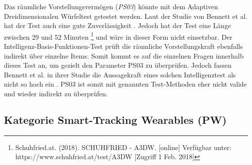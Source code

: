 Das räumliche Vorstellungsvermögen (\textit{PS03}) könnte mit dem Adaptiven Dreidimensionalen Würfeltest getestet werden. Laut der Studie von Bennett et al. hat der Test auch eine gute Zuverlässigkeit \cite{cognitivetestsfitnesstodrive}. Jedoch hat der Test eine Länge zwischen 29 und 52 Minuten \footnote{Schuhfried.at. (2018). SCHUHFRIED - A3DW. [online] Verfügbar unter: https://www.schuhfried.at/test/A3DW [Zugriff 1 Feb. 2018]} und wäre in dieser Form nicht einsetzbar. Der Intelligenz-Basis-Funktionen-Test prüft die räumliche Vorstellungskraft ebenfalls indirekt über einzelne Items. Somit kommt es auf die einzelnen Fragen innerhalb dieses Test an, um gezielt den Parameter PS03 zu überprüfen. Jedoch fassen Bennett et al. in ihrer Studie die Aussagekraft eines solchen Intelligenztest als nicht so hoch ein \cite{cognitivetestsfitnesstodrive}. PS03 ist somit mit genannten Test-Methoden eher nicht valide und wieder indirekt zu überprüfen.


\subsection{Kategorie Smart-Tracking Wearables (PW)}
